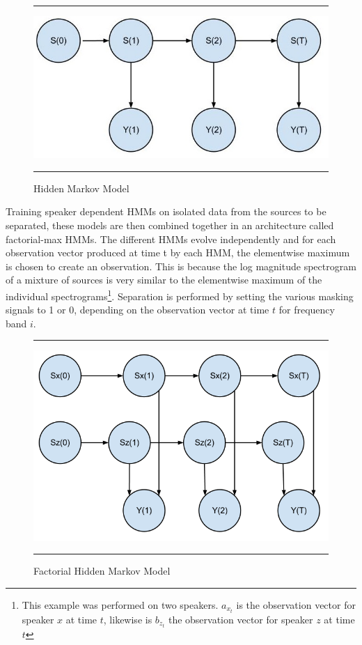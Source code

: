 \documentclass[11pt, oneside, a4paper]{report}
\begin{document}
\begin{figure}[h]
  \centering
  \hrule
  \includegraphics[width = .9\textwidth]{hmm}
  \hrule
  \caption{Hidden Markov Model}
  \label{hmm_figure}
\end{figure}



Training speaker dependent HMMs on isolated data from the sources to be separated, these models are then combined together in an architecture called factorial-max HMMs. The different HMMs evolve independently and for each observation vector produced at time t by each HMM, the elementwise maximum is chosen to create an observation. This is because the log magnitude spectrogram of a mixture of sources is very similar to the elementwise maximum of the individual spectrograms\footnote{This example was performed on two speakers. $a_{x_{t}}$ is the observation vector for speaker $x$ at time $t$, likewise is $b_{z_{t}}$ the observation vector for speaker $z$ at time $t$}. Separation is performed by setting the various masking signals to 1 or 0, depending on the observation vector at time $t$ for frequency band $i$.

\begin{figure}[h]
  \centering
  \hrule
  \includegraphics[width = .9\textwidth]{f_hmm}
  \hrule
  \caption{Factorial Hidden Markov Model}
  \label{fhmm_figure}
\end{figure}
\end{document}
